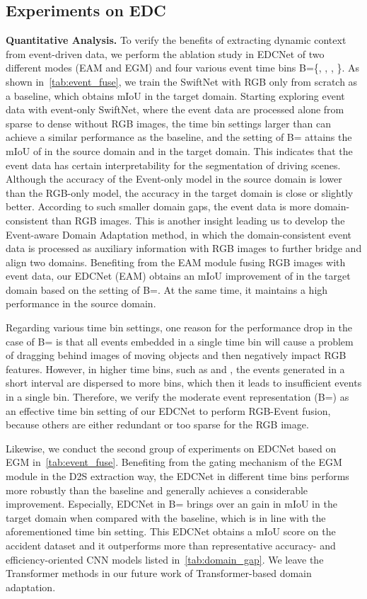 \documentclass[journal]{IEEEtran}
\begin{document}
\subsection{Experiments on EDC}\label{exp:event_fusion}
\textbf{Quantitative Analysis.}
{To verify the benefits of extracting dynamic context from event-driven data, we perform the ablation study in EDCNet of two different modes (EAM and EGM) and four various event time bins B=\{, , , \}.} As shown in~\cref{tab:event_fuse}, we train the SwiftNet with RGB only from scratch as a baseline, which obtains  mIoU in the target domain. {Starting exploring event data with event-only SwiftNet, where the event data are processed alone from sparse to dense without RGB images, the time bin settings larger than  can achieve a similar performance as the baseline, and the setting of B= attains the mIoU of  in the source domain and  in the target domain.} This indicates that the event data has certain interpretability for the segmentation of driving scenes. {Although the accuracy of the Event-only model in the source domain is lower than the RGB-only model, the accuracy in the target domain is close or slightly better. According to such smaller domain gaps, the event data is more domain-consistent than RGB images. This is another insight leading us to develop the Event-aware Domain Adaptation method, in which the domain-consistent event data is processed as auxiliary information with RGB images to further bridge and align two domains. Benefiting from the EAM module fusing RGB images with event data, our EDCNet (EAM) obtains an mIoU improvement of  in the target domain based on the setting of B=. At the same time, it maintains a high performance in the source domain.}

Regarding various time bin settings, one reason for the performance drop in the case of B= is that all events embedded in a single time bin will cause a problem of dragging behind images of moving objects and then negatively impact RGB features. However, in higher time bins, such as  and , the events generated in a short interval are dispersed to more bins, which then it leads to insufficient events in a single bin. Therefore, we verify the moderate event representation (B=) as an effective time bin setting of our EDCNet to perform RGB-Event fusion, because others are either redundant or too sparse for the RGB image.

Likewise, we conduct the second group of experiments on EDCNet based on EGM in~\cref{tab:event_fuse}. Benefiting from the gating mechanism of the EGM module in the D2S extraction way, the EDCNet in  different time bins performs more robustly than the baseline and generally achieves a considerable improvement. Especially, EDCNet in B= brings over an  gain in mIoU in the target domain when compared with the baseline, which is in line with the aforementioned time bin setting. This EDCNet obtains a  mIoU score on the accident dataset and it outperforms more than  representative accuracy- and efficiency-oriented {CNN models} listed in~\cref{tab:domain_gap}. We leave the Transformer methods in our future work of Transformer-based domain adaptation.
\end{document}
